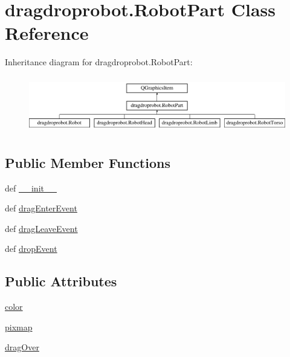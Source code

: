 \hypertarget{classdragdroprobot_1_1RobotPart}{}\section{dragdroprobot.\+Robot\+Part Class Reference}
\label{classdragdroprobot_1_1RobotPart}
Inheritance diagram for dragdroprobot.\+Robot\+Part\+:\begin{figure}[H]
\begin{center}
\leavevmode
\includegraphics[height=2.485207cm]{classdragdroprobot_1_1RobotPart}
\end{center}
\end{figure}
\subsection*{Public Member Functions}
\begin{DoxyCompactItemize}
\item 
def \hyperlink{classdragdroprobot_1_1RobotPart_a84d035140d5b237aa0eeaaa78237d158}{\+\_\+\+\_\+init\+\_\+\+\_\+}
\item 
def \hyperlink{classdragdroprobot_1_1RobotPart_a933b0a169a485acfa8bcfdeb831487d3}{drag\+Enter\+Event}
\item 
def \hyperlink{classdragdroprobot_1_1RobotPart_ac9dee15b9bca99e1ca5d612ac189c2d2}{drag\+Leave\+Event}
\item 
def \hyperlink{classdragdroprobot_1_1RobotPart_aa3f7f2cfa0b31cc521c5d46a3911794b}{drop\+Event}
\end{DoxyCompactItemize}
\subsection*{Public Attributes}
\begin{DoxyCompactItemize}
\item 
\hyperlink{classdragdroprobot_1_1RobotPart_a395bd1d86be2d8b111e20068d3330c6f}{color}
\item 
\hyperlink{classdragdroprobot_1_1RobotPart_a8f56d6b0d7cd1750995b55bd862728e1}{pixmap}
\item 
\hyperlink{classdragdroprobot_1_1RobotPart_af8c80240bf59843b8cef0eca699e9a58}{drag\+Over}
\end{DoxyCompactItemize}


